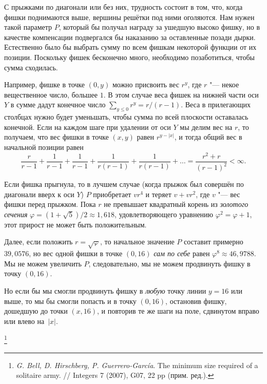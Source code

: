 \documentclass[twoside]{book}
\begin{document}
\medskip

С прыжками по диагонали или без них, трудность состоит в том, что, когда фишки поднимаются выше, вершины решётки под ними оголяются.
Нам нужен такой параметр $P$, который бы получал награду за ушедшую высоко фишку, но в качестве компенсации подвергался бы наказанию за оставленные позади дырки.
Естественно было бы выбрать сумму по всем фишкам некоторой функции от их позиции.
Поскольку фишек бесконечно много, необходимо позаботиться, чтобы сумма сходилась.

Например, фишке в точке $(0, y)$ можно присвоить вес $r^y$, где $r$ "--- некое вещественное число, большее $1$.
В этом случае веса фишек на нижней части оси $Y$ в сумме дадут конечное число $\sum_{y\le 0}r^y = r/(r-1)$.
Веса в прилегающих столбцах нужно будет уменьшать, чтобы сумма по всей плоскости оставалась конечной.
Если на каждом шаге при удалении от оси $Y$ мы делим вес на $r$, то получаем, что вес фишки в точке $(x, y)$ равен $r^{y - |x|}$, и тогда общий вес в начальной позиции равен
\[\frac r{r-1} + \frac 1{r-1} +\frac 1{r-1} +\frac 1{r(r-1)} +\frac 1{r(r-1)} + \ldots =\frac{r^2+r}{(r-1)^2} <\infty.\]

Если фишка прыгнула, то в лучшем случае (когда прыжок был совершён по диагонали вверх к оси $Y$) $P$ приобретает $vr^4$ и теряет $v+vr^2$, где $v$ "--- вес фишки перед прыжком.
Пока $r$ не превышает квадратный корень из \emph{золотого сечения} $\varphi=(1+\sqrt5)/2\approx 1{,}618$, удовлетворяющего уравнению $\varphi^2=\varphi+1$, этот прирост не может быть положительным.

Далее, если положить $r = \sqrt{\varphi}$, то начальное значение $P$ составит примерно $39{,}0576$, но вес одной фишки в точке $(0, 16)$ \emph{сам по себе} равен $\varphi^8\approx 46{,}9788$.
Мы не можем увеличить $P$, следовательно, мы не можем продвинуть фишку в точку $(0, 16)$.

Но если бы мы смогли продвинуть фишку в \emph{любую} точку линии $y = 16$ или выше, то мы бы смогли попасть и в точку $(0, 16)$, остановив фишку, дошедшую до точки $(x, 16)$, и повторив те же шаги на поле, сдвинутом вправо или влево на~$|x|$.
\heart

%
\footnote{\emph{G. Bell, D. Hirschberg, P. Guerrero-García}.
The minimum size required of a solitaire army. 
/\!/
Integers 7 (2007), G07, 22 pp (прим. ред.).}
\end{document}
